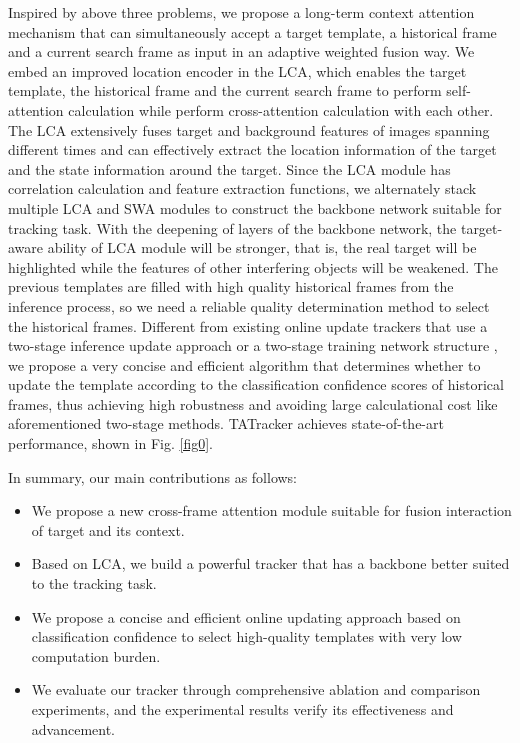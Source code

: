 \documentclass[letterpaper]{article} \usepackage{aaai23}  \usepackage{times}  \usepackage{helvet}  \usepackage{courier}  \usepackage[hyphens]{url}  \usepackage{graphicx} \urlstyle{rm} \def\UrlFont{\rm}  \usepackage{natbib}  \usepackage{caption} \frenchspacing  \setlength{\pdfpagewidth}{8.5in}  \setlength{\pdfpageheight}{11in}  \usepackage{algorithm}
\begin{document}
Inspired by above three problems, we propose a long-term context attention mechanism that can simultaneously accept a target template, a historical frame and a current search frame as input in an adaptive weighted fusion way. We embed an improved location encoder in the LCA, which enables the target template, the historical frame and the current search frame to perform self-attention calculation while perform cross-attention calculation with each other. The LCA extensively fuses target and background features of images spanning different times and can effectively extract the location information of the target and the state information around the target. Since the LCA module has correlation calculation and feature extraction functions, we alternately stack multiple LCA and SWA \cite{swin} modules to construct the backbone network suitable for tracking task. With the deepening of layers of the backbone network, the target-aware ability of LCA module will be stronger, that is, the real target will be highlighted while the features of other interfering objects will be weakened. The previous templates are filled with high quality historical frames from the inference process, so we need a reliable quality determination method to select the historical frames. Different from existing online update trackers that use a two-stage inference update approach \cite{tomp} or a two-stage training network structure \cite{mixformer,stark}, we propose a very concise and efficient algorithm that determines whether to update the template according to the classification confidence scores of historical frames, thus achieving high robustness and avoiding large calculational cost like aforementioned two-stage methods. TATracker achieves state-of-the-art performance, shown in Fig. \ref{fig0}.

In summary, our main contributions as follows:
\begin{itemize}
    \item We propose a new cross-frame attention module suitable for fusion interaction of target and its context.
    \item Based on LCA, we build a powerful tracker that has a backbone better suited to the tracking task.
    \item We propose a concise and efficient online updating approach based on classification confidence to select high-quality templates with very low computation burden.
    \item We evaluate our tracker through comprehensive ablation and comparison experiments, and the experimental results verify its effectiveness and advancement.
\end{itemize}
\end{document}
